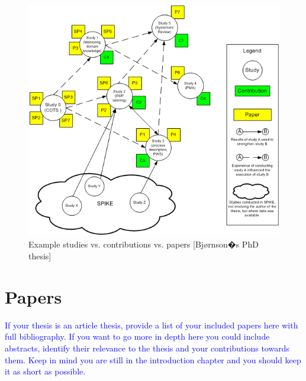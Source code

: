 \begin{figure}
\begin{center}
\includegraphics[width=.75\textwidth]{../img/1-studies_contributions_papers} \caption[Example studies vs. contributions 
vs. papers]{Example studies vs. contributions vs. papers [Bj{\o}rnson�s PhD thesis]}
\label{fig:1-studies_contributions_papers} 
\end{center}
\end{figure}


\section{Papers}
\textcolor{blue}{If your thesis is an article thesis, provide a list of your included papers here with full 
bibliography. If you want to go more in depth here you could include abstracts, identify their relevance to the thesis 
and your contributions towards them. Keep in mind you are still in the introduction chapter and you should keep it as 
short as possible.}



